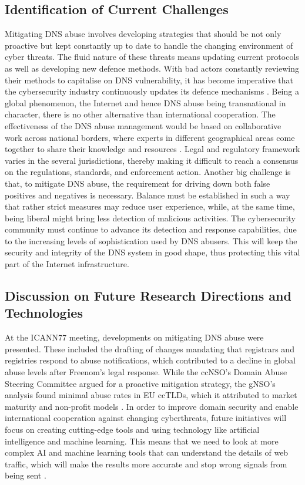 \subsection{Identification of Current Challenges}

Mitigating DNS abuse involves developing strategies that should be not only proactive but kept constantly up to date to handle the changing environment of cyber threats. The fluid nature of these threats means updating current protocols as well as developing new defence methods. With bad actors constantly reviewing their methods to capitalise on DNS vulnerability, it has become imperative that the cybersecurity industry continuously updates its defence mechanisms \cite{bhattacharya2023dns}. Being a global phenomenon, the Internet and hence DNS abuse being transnational in character, there is no other alternative than international cooperation. The effectiveness of the DNS abuse management would be based on collaborative work across national borders, where experts in different geographical areas come together to share their knowledge and resources \cite{altulaihan2022cybersecurity}. Legal and regulatory framework varies in the several jurisdictions, thereby making it difficult to reach a consensus on the regulations, standards, and enforcement action. Another big challenge is that, to mitigate DNS abuse, the requirement for driving down both false positives and negatives is necessary. Balance must be established in such a way that rather strict measures may reduce user experience, while, at the same time, being liberal might bring less detection of malicious activities. The cybersecurity community must continue to advance its detection and response capabilities, due to the increasing levels of sophistication used by DNS abusers. This will keep the security and integrity of the DNS system in good shape, thus protecting this vital part of the Internet infrastructure.

\subsection{Discussion on Future Research Directions and Technologies}

At the ICANN77 meeting, developments on mitigating DNS abuse were presented. These included the drafting of changes mandating that registrars and registries respond to abuse notifications, which contributed to a decline in global abuse levels after Freenom's legal response. While the ccNSO's Domain Abuse Steering Committee argued for a proactive mitigation strategy, the gNSO's analysis found minimal abuse rates in EU ccTLDs, which it attributed to market maturity and non-profit models \cite{VanRoste2023}. In order to improve domain security and enable international cooperation against changing cyberthreats, future initiatives will focus on creating cutting-edge tools and using technology like artificial intelligence and machine learning. This means that we need to look at more complex AI and machine learning tools that can understand the details of web traffic, which will make the results more accurate and stop wrong signals from being sent \cite{ISG2023}.

